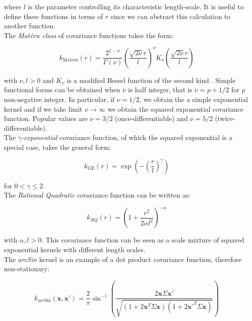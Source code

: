 \documentclass[10pt,a4paper,twoside]{book}
\begin{document}
where $l$ is the parameter controlling its characteristic length-scale. It is useful to define these functions in terms of $r$ since we can abstract this calculation to another function. \\

The \textit{Mat\'ern class} of covariance functions \cite{Minasny2005} takes the form:

\begin{equation}
k_{\textrm{Matern}}(r) = \dfrac{2^{1-\nu}}{\Gamma(\nu)}\left(\dfrac{\sqrt{2\nu} r}{l}    \right)^\nu K_\nu\left( \dfrac{\sqrt{2\nu}r}{l} \right)
\end{equation}

with $\nu, l > 0$ and $K_\nu$ is a modified Bessel function of the second kind \cite{Arfken2005}.  Simple functional forms can be obtained when $\nu$ is half integer, that is $\nu = p + 1/2$ for $p$ non-negative integer. In particular, if $\nu=1/2$, we obtain the a simple exponential kernel and if we take limit $\nu \rightarrow \infty$ we obtain the squared exponential covariance function. Popular values are $\nu=3/2$ (once-differentiable) and $\nu=5/2$ (twice-differentiable).\\


The $\gamma$\textit{-exponential} covariance function, of which the squared exponential is a special case, takes the general form:

\begin{equation}
k_{\mathrm{GE}}(r) = \exp\left( - \left(\dfrac{r}{l}\right)^\gamma  \right)
\end{equation}

for $0 < \gamma \leq 2$. \\

The \textit{Rational Quadratic} covariance function can be written as:

\begin{equation}
k_{RQ}(r) = \left( 1 + \dfrac{r^2}{2\alpha l^2} \right)^{-\alpha}
\end{equation}

with $\alpha, l > 0$. This covariance function can be seen as a scale mixture of squared exponential kernels with different length scales.\\


The \textit{arcSin} kernel is an example of a dot product covariance function, therefore non-stationary:

\begin{equation}
k_{\textrm{arcSin}}(\boldsymbol{x}, \boldsymbol{x'}) = \dfrac{2}{\pi}\sin^{-1}\left(\dfrac{2\boldsymbol{x}\Sigma\boldsymbol{x'}}{\sqrt{(1 + 2\boldsymbol{x}^T\Sigma\boldsymbol{x})(1 + 2\boldsymbol{x'}^T\Sigma\boldsymbol{x})}}   \right)
\end{equation}\\
\end{document}
